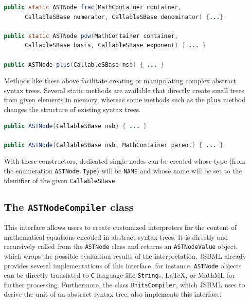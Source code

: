 \begin{lstlisting}[language=Java,numbers=none,float=h,captionpos=t,
title={Some examples for convenient manipulation methods, of which some are static:}]
public static ASTNode frac(MathContainer container,
      CallableSBase numerator, CallableSBase denominator) {...}

public static ASTNode pow(MathContainer container,
      CallableSBase basis, CallableSBase exponent) { ... }

public ASTNode plus(CallableSBase nsb) { ... }
\end{lstlisting}
Methods like these above facilitate creating or manipulating complex abstract
syntax trees. Several static methods are available that directly create small
trees from given elements in memory, whereas some methods such as the
\texttt{plus} method changes the structure of existing syntax trees.

\begin{lstlisting}[language=Java,numbers=none,float=h,captionpos=t,
title={Some examples for convenient constructors:}]
public ASTNode(CallableSBase nsb) { ... }

public ASTNode(CallableSBase nsb, MathContainer parent) { ... }
\end{lstlisting}
With these constructors, dedicated single nodes can be created whose type
(from the enumeration \texttt{ASTNode.Type}) will be \texttt{NAME}
%
and whose name will be set to the identifier of the given
\texttt{CallableSBase}.
%
%


\subsection{The \texttt{ASTNodeCompiler} class}

This interface allows users to create customized interpreters for the
content of mathematical equations encoded in abstract syntax trees. It
is directly and recursively called from the \texttt{ASTNode} class and returns
an \texttt{ASTNodeValue}
%
%
object, which wraps the possible evaluation results of the interpretation.
JSBML already provides several implementations of this
interface, for instance, \texttt{ASTNode} objects can be directly translated to
\texttt{C} language-like \texttt{String}s,
\LaTeX, or MathML for further processing.
Furthermore, the class \texttt{UnitsCompiler},
%
which JSBML uses to derive the unit of an abstract syntax tree, also implements
this interface.

